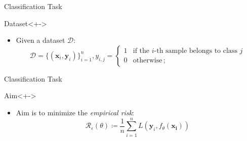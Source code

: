 \begin{frame}{Classification Task}
\begin{block}{Dataset}<+->
\centering
\begin{itemize}
    \item Given a dataset $\mathcal{D}$:
    \begin{equation}
        \mathcal{D} = \{(\mathbf{x}_i, \mathbf{y}_i)\}_{i=1}^n, y_{i,j} = \begin{cases}
            1 & \text{if the $i$-th sample belongs to class $j$} \\
            0 & \text{otherwise} \,;
        \end{cases}
    \end{equation}
\end{itemize}
\end{block}
\end{frame}

\begin{frame}{Classification Task}
\begin{block}{Aim}<+->
\centering
\begin{itemize}
    \item Aim is to minimize the \emph{empirical risk}: \begin{equation}
         \mathcal{R}_{\epsilon}(\theta) \coloneqq \frac{1}{n}\sum_{i=1}^{n} L(\mathbf{y}_i,f_{\theta}(\mathbf{x_i})) 
    \end{equation}
\end{itemize}
\end{block}

\end{frame}